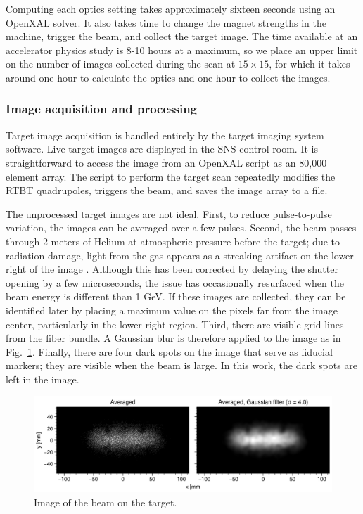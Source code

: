 %
Computing each optics setting takes approximately sixteen seconds using an OpenXAL solver. It also takes time to change the magnet strengths in the machine, trigger the beam, and collect the target image. The time available at an accelerator physics study is 8-10 hours at a maximum, so we place an upper limit on the number of images collected during the scan at $15 \times 15$, for which it takes around one hour to calculate the optics and one hour to collect the images. 


\subsubsection{Image acquisition and processing}

Target image acquisition is handled entirely by the target imaging system software. Live target images are displayed in the SNS control room. It is straightforward to access the image from an OpenXAL script as an 80,000 element array. The script to perform the target scan repeatedly modifies the RTBT quadrupoles, triggers the beam, and saves the image array to a file.

The unprocessed target images are not ideal. First, to reduce pulse-to-pulse variation, the images can be averaged over a few pulses. Second, the beam passes through 2 meters of Helium at atmospheric pressure before the target; due to radiation damage, light from the gas appears as a streaking artifact on the lower-right of the image \cite{Blokland2010}. Although this has been corrected by delaying the shutter opening by a few microseconds, the issue has occasionally resurfaced when the beam energy is different than 1 GeV. If these images are collected, they can be identified later by placing a maximum value on the pixels far from the image center, particularly in the lower-right region. Third, there are visible grid lines from the fiber bundle. A Gaussian blur is therefore applied to the image as in Fig.~\ref{fig:target_image}. Finally, there are four dark spots on the image that serve as fiducial markers; they are visible when the beam is large. In this work, the dark spots are left in the image.
%
\begin{figure}[!p]
    \centering
    \vspace*{5cm}
    \includegraphics[width=1.0\textwidth]{Images/chapter4/target_image.png}
    \caption{Image of the beam on the target.}
    \label{fig:target_image}
     \vspace*{5cm}
\end{figure}
%


